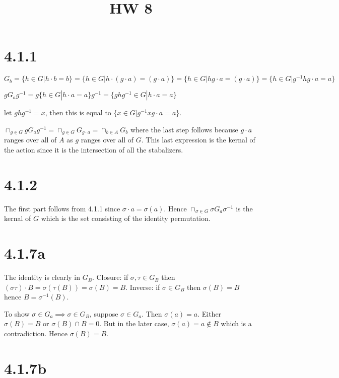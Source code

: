 \documentclass{article}
\title{HW 8}
\date{}
\def\inv{{-1}}
\begin{document}
\maketitle




\section*{4.1.1}

$G_b = \{h \in G | h \cdot b = b\} = \{h \in G | h \cdot (g \cdot a) = (g \cdot a)\} = \{h \in G | hg \cdot a = (g \cdot a)\} = \{h \in G | g^\inv h g \cdot a = a\}$

$g G_a g^\inv = g \{h \in G | h \cdot a = a\} g^\inv = \{ghg^\inv \in G | h \cdot a = a\} $

let $g h g^\inv = x$, then this is equal to $\{x \in G | g^\inv x g \cdot a = a\}$.

$\cap_{g \in G} g G_a g^\inv = \cap_{g \in G} G_{g \cdot a} = \cap_{b \in A} G_b$ where the last step follows because $g \cdot a$ ranges over all of $A$ as $g$ ranges over all of $G$. This last expression is the kernal of the action since it is the intersection of all the stabalizers.

\section*{4.1.2}

The first part follows from 4.1.1 since $\sigma \cdot a = \sigma(a)$. Hence $\cap_{\sigma \in G} \sigma G_a \sigma^\inv$ is the kernal of $G$ which is the set consisting of the identity permutation. 

\section*{4.1.7a}

The identity is clearly in $G_B$. Closure: if $\sigma, \tau \in G_B$ then $(\sigma \tau) \cdot B = \sigma(\tau(B)) = \sigma(B) = B$. Inverse: if $\sigma \in G_B$ then $\sigma(B) = B$ hence $B = \sigma^\inv(B)$.

To show $\sigma \in G_a \implies \sigma \in G_B$, suppose $\sigma \in G_a$. Then $\sigma(a) = a$. Either $\sigma(B) = B$ or $\sigma(B) \cap B = 0$. But in the later case, $\sigma(a) = a \not\in B$ which is a contradiction. Hence $\sigma(B) = B$.

\section*{4.1.7b}
\end{document}
